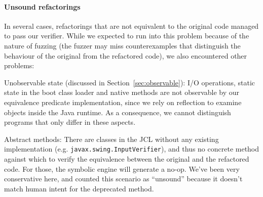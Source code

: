 \documentclass[conference]{IEEEtran}
\begin{document}
\paragraph{Unsound refactorings}
%
%
In several cases, refactorings that are not equivalent to the original code managed to pass our verifier.
While we expected to run into this problem because of the nature of fuzzing (the fuzzer may miss counterexamples that distinguish the behaviour of the original from the refactored code),
we also encountered other problems:


Unobservable state (discussed in Section~\ref{sec:observable}): I/O operations, static state in the boot class loader and
native methods are not observable by our equivalence predicate implementation,
since we rely on reflection to examine objects inside the Java runtime. As
a consequence, we cannot distinguish programs that only differ in these aspects.

Abstract methods: 
There are classes in the JCL without any
existing implementation (e.g. \lstinline{javax.swing.InputVerifier}), and thus no concrete
method against which to verify the equivalence between the original and the refactored code. For those, the symbolic engine will
generate a no-op. We've been very conservative here, and counted this scenario as ``unsound'' because
it doesn't match human intent for the deprecated method.
\end{document}

